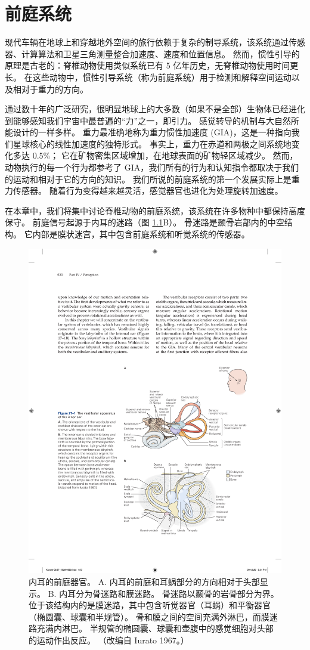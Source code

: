\chapter{前庭系统} \label{chap:chap27}

现代车辆在地球上和穿越地外空间的旅行依赖于复杂的制导系统，该系统通过传感器、计算算法和卫星三角测量整合加速度、速度和位置信息。 然而，惯性引导的原理是古老的：脊椎动物使用类似系统已有 5 亿年历史，无脊椎动物使用时间更长。 在这些动物中，惯性引导系统（称为前庭系统）用于检测和解释空间运动以及相对于重力的方向。

通过数十年的广泛研究，很明显地球上的大多数（如果不是全部）生物体已经进化到能够感知我们宇宙中最普遍的“力”之一，即引力。 感觉转导的机制与大自然所能设计的一样多样。 重力最准确地称为重力惯性加速度 (GIA)，这是一种指向我们星球核心的线性加速度的独特形式。 事实上，重力在赤道和两极之间系统地变化多达 0.5\%； 它在矿物密集区域增加，在地球表面的矿物轻区域减少。 然而，动物执行的每一个行为都参考了 GIA，我们所有的行为和认知指令都取决于我们的运动和相对于它的方向的知识。 我们所说的前庭系统的第一个发展实际上是重力传感器。 随着行为变得越来越灵活，感觉器官也进化为处理旋转加速度。

在本章中，我们将集中讨论脊椎动物的前庭系统，该系统在许多物种中都保持高度保守。 
前庭信号起源于内耳的迷路（图 \ref{fig:27_1}B）。 
骨迷路是颞骨岩部内的中空结构。 它内部是膜状迷宫，其中包含前庭系统和听觉系统的传感器。

\begin{figure}[htbp]
	\centering
	\includegraphics[width=0.7\linewidth]{chap27/fig_27_1}
	\caption{内耳的前庭器官。 A. 内耳的前庭和耳蜗部分的方向相对于头部显示。 B. 内耳分为骨迷路和膜迷路。 骨迷路以颞骨的岩骨部分为界。 位于该结构内的是膜迷路，其中包含听觉器官（耳蜗）和平衡器官（椭圆囊、球囊和半规管）。 骨和膜之间的空间充满外淋巴，而膜迷路充满内淋巴。 半规管的椭圆囊、球囊和壶腹中的感觉细胞对头部的运动作出反应。 （改编自 Iurato 1967。）}
	\label{fig:27_1}
\end{figure}

